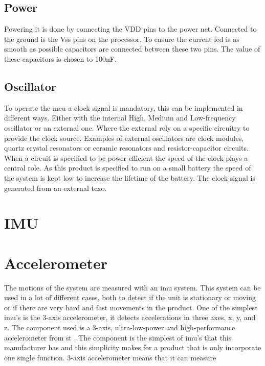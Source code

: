 
\subsection{Power}
Powering it is done by connecting the VDD pins to the power net. Connected to the ground is the Vss pins on the processor. To ensure the current fed is as smooth as possible capacitors are connected between these two pins. The value of these capacitors is chosen to 100nF.  

\subsection{Oscillator}
To operate the \gls{mcu} a clock signal is mandatory, this can be implemented in different ways. Either with the internal High, Medium and Low-frequency oscillator or an external one. Where the external rely on a specific circuitry to provide the clock source. Examples of external oscillators are clock modules, quartz crystal resonators or ceramic resonators and resistor-capacitor circuits. When a circuit is specified to be power efficient the speed of the clock plays a central role. As this product is specified to run on a small battery the speed of the system is kept low to increase the lifetime of the battery. The clock signal is generated from an external \gls{tcxo}.


\section{IMU}



\newpage %
\section{Accelerometer} 
The motions of the system are measured with an \gls{imu} system. This system can be used in a lot of different cases, both to detect if the unit is stationary or moving or if there are very hard and fast movements in the product. One of the simplest \gls{imu}'s is the 3-axis accelerometer, it detects accelerations in three axes, x, y, and z. The component used is a 3-axis, ultra-low-power and high-performance accelerometer from \gls{st} \cite{ST_acc}. The component is the simplest of \gls{imu}'s that this manufacturer has and this simplicity makes for a product that is only incorporate one single function. 3-axis accelerometer means that it can measure  

